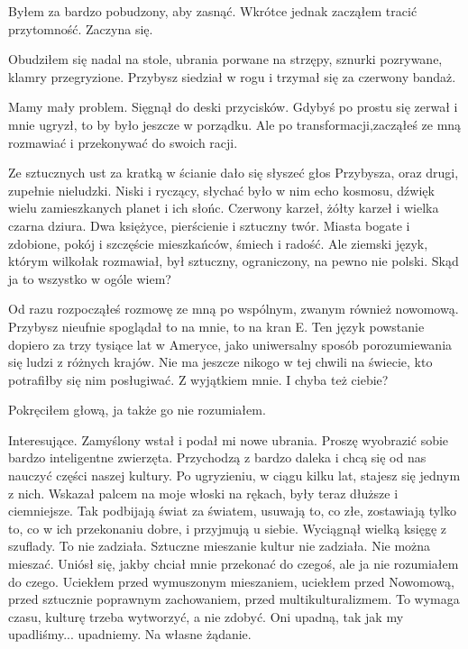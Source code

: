 Byłem za bardzo pobudzony, aby zasnąć. Wkrótce jednak zacząłem tracić przytomność. Zaczyna się.

\divider{}

Obudziłem się nadal na stole, ubrania porwane na strzępy, sznurki pozrywane, klamry przegryzione.
Przybysz siedział w rogu i trzymał się za czerwony bandaż.

\begin{dialogue}
\ds{} Mamy mały problem.
\dm{} Sięgnął do deski przycisków.
\dm{} Gdybyś po prostu się zerwał i mnie ugryzł, to by było jeszcze w porządku.
Ale po transformacji,zacząłeś ze mną rozmawiać i przekonywać do swoich racji.
\end{dialogue}

Ze sztucznych ust za kratką w ścianie dało się słyszeć głos Przybysza, oraz drugi, zupełnie nieludzki.
Niski i ryczący, słychać było w nim echo kosmosu, dźwięk wielu zamieszkanych planet i ich słońc.
Czerwony karzeł, żółty karzeł i wielka czarna dziura. 
Dwa księżyce, pierścienie i sztuczny twór.
Miasta bogate i zdobione, pokój i szczęście mieszkańców, śmiech i radość.
Ale ziemski język, którym wilkołak rozmawiał, był sztuczny, ograniczony, na pewno nie polski.
Skąd ja to wszystko w ogóle wiem?

\begin{dialogue}
\ds{} Od razu rozpocząłeś rozmowę ze mną po wspólnym, zwanym również nowomową. 
\dm{} Przybysz nieufnie spoglądał to na mnie, to na kran E. 
\dm{} Ten język powstanie dopiero za trzy tysiące lat w Ameryce, jako uniwersalny sposób porozumiewania się ludzi z różnych krajów.
Nie ma jeszcze nikogo w tej chwili na świecie, kto potrafiłby się nim posługiwać.
Z wyjątkiem mnie. I chyba też ciebie?
\end{dialogue}

Pokręciłem głową, ja także go nie rozumiałem.

\begin{dialogue}
\ds{} Interesujące.
\dm{} Zamyślony wstał i podał mi nowe ubrania.
\dm{} Proszę wyobrazić sobie bardzo inteligentne zwierzęta. 
Przychodzą z bardzo daleka i chcą się od nas nauczyć części naszej kultury.
Po ugryzieniu, w ciągu kilku lat, stajesz się jednym z nich. 
\dm{} Wskazał palcem na moje włoski na rękach, były teraz dłuższe i ciemniejsze.
\dm{} Tak podbijają świat za światem, usuwają to, co złe, zostawiają tylko to, co w ich przekonaniu dobre, i przyjmują u siebie.
\dm{} Wyciągnął wielką księgę z szuflady.
\dm{} To nie zadziała. Sztuczne mieszanie kultur nie zadziała. Nie można mieszać.
\dm{} Uniósł się, jakby chciał mnie przekonać do czegoś, ale ja nie rozumiałem do czego.
\dm{} Uciekłem przed wymuszonym mieszaniem, uciekłem przed Nowomową, przed sztucznie poprawnym zachowaniem, przed multikulturalizmem.
To wymaga czasu, kulturę trzeba wytworzyć, a nie zdobyć.
Oni upadną, tak jak my upadliśmy... upadniemy. Na własne żądanie.
\end{dialogue}

